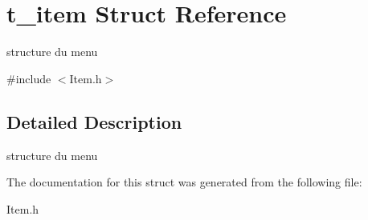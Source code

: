 \hypertarget{structt__item}{}\section{t\+\_\+item Struct Reference}
\label{structt__item}


structure du menu  




{\ttfamily \#include $<$Item.\+h$>$}



\subsection{Detailed Description}
structure du menu 

The documentation for this struct was generated from the following file\+:\begin{DoxyCompactItemize}
\item 
Item.\+h\end{DoxyCompactItemize}
